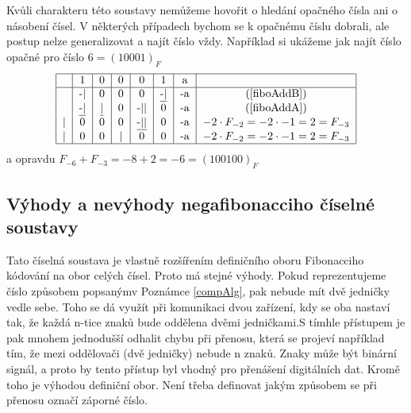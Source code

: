 \documentclass[czech,bachelor,dept470,male]{diploma}
\begin{document}
\begin{remark}
	Kvůli charakteru této soustavy nemůžeme hovořit o hledání opačného čísla ani o násobení čísel. V některých případech bychom se k opačnému číslu dobrali, ale postup nelze generalizovat a najít číslo vždy.\newline
	Například si ukážeme jak najít číslo opačné pro číslo $6 = (10001)_F$
	\begin{equation}
		\begin{tabular}{|c|c|c|c|c|c|c|c|}
			\hline
			  & 1              & 0             & 0 & 0               & 1              & a  &                                            \\ \hline
			  & -|             & 0             & 0 & 0               & \underline{-|} & -a & (\ref{fiboAddB})                           \\
			  & \underline{-|} & \underline{|} & 0 & -||             & 0              & -a & (\ref{fiboAddA})                           \\
			| & 0              & 0             & 0 & \underline{-||} & 0              & -a & $-2\cdot F_{-2} = -2\cdot-1 = 2 = F_{-3} $ \\
			| & 0              & 0             & | & 0               & 0              & -a & $-2\cdot F_{-2} = -2\cdot-1 = 2 = F_{-3} $ \\
			\hline
		\end{tabular}
	\end{equation}
	a opravdu $F_{-6}+F_{-3}=-8+2=-6=(100100)_F$
\end{remark}
\subsection{Výhody a nevýhody negafibonacciho číselné soustavy}
Tato číselná soustava je vlastně rozšířením definičního oboru Fibonacciho kódování \cite{fibCoding} na obor celých čísel. Proto má stejné výhody. Pokud reprezentujeme číslo způsobem popsaným\newline v Poznámce \ref{compAlg}, pak nebude mít dvě jedničky vedle sebe. Toho se dá využít při komunikaci dvou zařízení, kdy se oba nastaví tak, že každá n-tice znaků bude oddělena dvěmi jedničkami.\newline S tímhle přístupem je pak mnohem jednodušší odhalit chybu při přenosu, která se projeví například tím, že mezi oddělovači (dvě jedničky) nebude n znaků. Znaky může být binární signál, a proto by tento přístup byl vhodný pro přenášení digitálních dat. Kromě toho je výhodou definiční obor. Není třeba definovat jakým způsobem se při přenosu označí záporné číslo.
\end{document}
